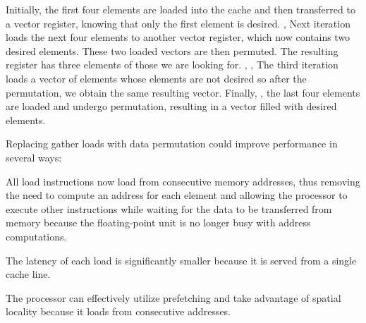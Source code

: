  Initially, the first four elements are loaded into the cache and  then transferred to a vector register, knowing that only the first element is desired. ,  Next iteration loads the next four elements to another vector register, which now contains two desired elements.  These two loaded vectors are then permuted. The resulting register has three elements of those we are looking for. , ,  The third iteration loads a vector of elements whose elements are not desired so after the permutation,  we obtain the same resulting vector. Finally, ,  the last four elements are loaded and undergo permutation,  resulting in a vector filled with desired elements.

Replacing gather loads with data permutation could improve performance in several ways: 
\begin{inparaenum}[(i)]
  \item All load instructions now load from consecutive memory addresses, thus removing the need to compute an address for each element and allowing the processor to execute other instructions while waiting for the data to be transferred from memory because the floating-point unit is no longer busy with address computations. 
  \item The latency of each load is significantly smaller because it is served from a single cache line.
  \item The processor can effectively utilize prefetching and take advantage of spatial locality because it loads from consecutive addresses.
\end{inparaenum}


